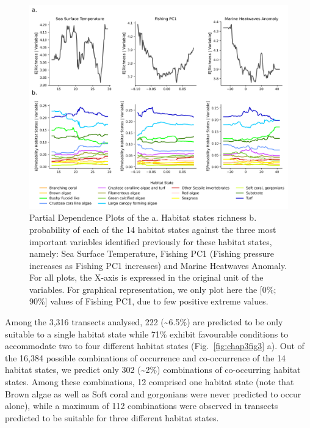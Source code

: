 \begin{refsection}
\begin{figure}
\hypertarget{fig:chap3fig2}{%
\centering
\includegraphics{03-Chapitre3/figures/08-pdp_shap_env_richness.png}
\caption[Partial Dependence Plots of the a. Habitat states richness b.
probability of each of the 14 habitat states against the three most
important variables identified.]{Partial Dependence Plots of the a. Habitat states richness b.
probability of each of the 14 habitat states against the three most
important variables identified previously for these habitat states,
namely: Sea Surface Temperature, Fishing PC1 (Fishing pressure increases
as Fishing PC1 increases) and Marine Heatwaves Anomaly. For all plots,
the X-axis is expressed in the original unit of the variables. For
graphical representation, we only plot here the {[}0\%; 90\%{]} values
of Fishing PC1, due to few positive extreme
values.}\label{fig:chap3fig2}
}
\end{figure}

Among the 3,316 transects analysed, 222 (\textasciitilde6.5\%) are
predicted to be only suitable to a single habitat state while 71\%
exhibit favourable conditions to accommodate two to four different
habitat states (Fig.~\ref{fig:chap3fig3} a). Out of the 16,384 possible
combinations of occurrence and co-occurrence of the 14 habitat states,
we predict only 302 (\textasciitilde2\%) combinations of co-occurring
habitat states. Among these combinations, 12 comprised one habitat state
(note that Brown algae as well as Soft coral and gorgonians were never
predicted to occur alone), while a maximum of 112 combinations were
observed in transects predicted to be suitable for three different
habitat states.


\end{refsection}
